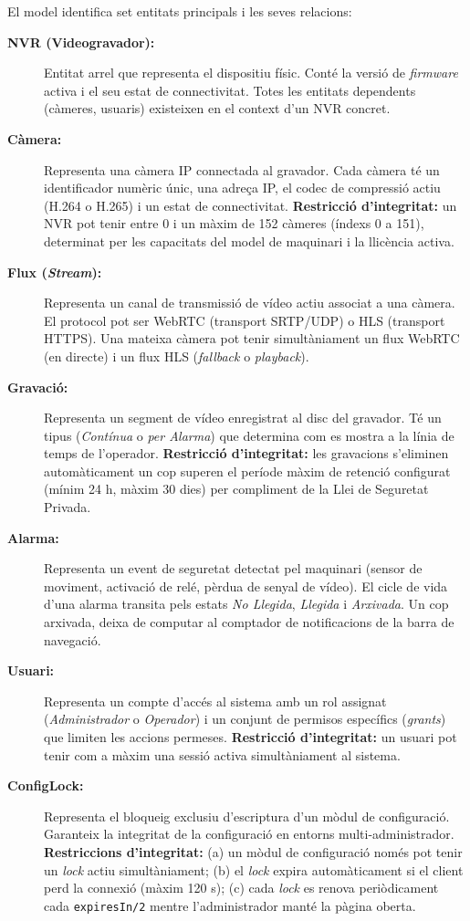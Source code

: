 \clearpage
El model identifica set entitats principals i les seves relacions:

\begin{description}
  \item[\textbf{NVR (Videogravador):}] Entitat arrel que representa el dispositiu físic. Conté la versió de \textit{firmware} activa i el seu estat de connectivitat. Totes les entitats dependents (càmeres, usuaris) existeixen en el context d'un NVR concret.

  \item[\textbf{Càmera:}] Representa una càmera IP connectada al gravador. Cada càmera té un identificador numèric únic, una adreça IP, el codec de compressió actiu (H.264 o H.265) i un estat de connectivitat. \textbf{Restricció d'integritat:} un NVR pot tenir entre 0 i un màxim de 152 càmeres (índexs 0 a 151), determinat per les capacitats del model de maquinari i la llicència activa.

  \item[\textbf{Flux (\textit{Stream}):}] Representa un canal de transmissió de vídeo actiu associat a una càmera. El protocol pot ser WebRTC (transport SRTP/UDP) o HLS (transport HTTPS). Una mateixa càmera pot tenir simultàniament un flux WebRTC (en directe) i un flux HLS (\textit{fallback} o \textit{playback}).

  \item[\textbf{Gravació:}] Representa un segment de vídeo enregistrat al disc del gravador. Té un tipus (\textit{Contínua} o \textit{per Alarma}) que determina com es mostra a la línia de temps de l'operador. \textbf{Restricció d'integritat:} les gravacions s'eliminen automàticament un cop superen el període màxim de retenció configurat (mínim 24 h, màxim 30 dies) per compliment de la Llei de Seguretat Privada.

  \item[\textbf{Alarma:}] Representa un event de seguretat detectat pel maquinari (sensor de moviment, activació de relé, pèrdua de senyal de vídeo). El cicle de vida d'una alarma transita pels estats \textit{No Llegida}, \textit{Llegida} i \textit{Arxivada}. Un cop arxivada, deixa de computar al comptador de notificacions de la barra de navegació.

  \item[\textbf{Usuari:}] Representa un compte d'accés al sistema amb un rol assignat (\textit{Administrador} o \textit{Operador}) i un conjunt de permisos específics (\textit{grants}) que limiten les accions permeses. \textbf{Restricció d'integritat:} un usuari pot tenir com a màxim una sessió activa simultàniament al sistema.

  \item[\textbf{ConfigLock:}] Representa el bloqueig exclusiu d'escriptura d'un mòdul de configuració. Garanteix la integritat de la configuració en entorns multi-administrador. \textbf{Restriccions d'integritat:} (a) un mòdul de configuració només pot tenir un \textit{lock} actiu simultàniament; (b) el \textit{lock} expira automàticament si el client perd la connexió (màxim 120 s); (c) cada \textit{lock} es renova periòdicament cada \texttt{expiresIn/2} mentre l'administrador manté la pàgina oberta.
\end{description}

